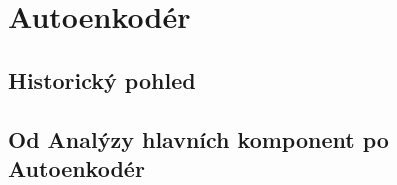 \section{Autoenkodér}
\subsection{Historický pohled}
\subsection{Od Analýzy hlavních komponent po Autoenkodér}
